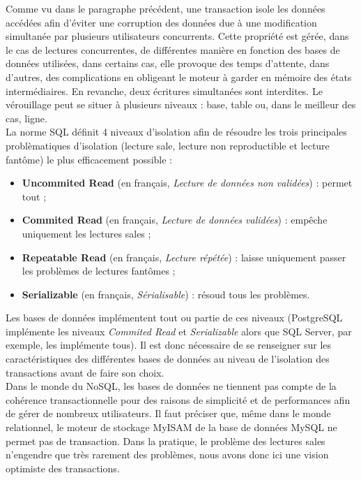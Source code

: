 	Comme vu dans le paragraphe précédent, une transaction isole les données accédées afin d'éviter une corruption des données due à une modification simultanée par plusieurs utilisateurs concurrents. Cette propriété est gérée, dans le cas de lectures concurrentes, de différentes manière en fonction des bases de données utilisées, dans certains cas, elle provoque des temps d'attente, dans d'autres, des complications en obligeant le moteur à garder en mémoire des états intermédiaires. En revanche, deux écritures simultanées sont interdites. Le vérouillage peut se situer à plusieurs niveaux : base, table ou, dans le meilleur des cas, ligne.\\

	La norme SQL définit 4 niveaux d'isolation afin de résoudre les trois principales problèmatiques d'isolation (lecture sale, lecture non reproductible et lecture fantôme) le plus efficacement possible :
	\vspace{10px}
	\begin{itemize}
		\item \textbf{Uncommited Read} (en français, \textit{Lecture de données non validées}) : permet tout ;
		\item \textbf{Commited Read} (en français, \textit{Lecture de données validées}) : empêche uniquement les lectures sales ;
		\item \textbf{Repeatable Read} (en français, \textit{Lecture répétée}) : laisse uniquement passer les problèmes de lectures fantômes ;
		\item \textbf{Serializable} (en français, \textit{Sérialisable}) : résoud tous les problèmes.
	\end{itemize}
	\vspace{20px}
	 Les bases de données implémentent tout ou partie de ces niveaux (PostgreSQL implémente les niveaux \textit{Commited Read} et \textit{Serializable}\cite{isolationTransactionPostgre} alors que SQL Server, par exemple, les implémente tous\cite{isolationTransactionSQLServer}). Il est donc nécessaire de se renseigner sur les caractéristiques des différentes bases de données au niveau de l'isolation des transactions avant de faire son choix.\\

	Dans le monde du NoSQL, les bases de données ne tiennent pas compte de la cohérence transactionnelle pour des raisons de simplicité et de performances afin de gérer de nombreux utilisateurs. Il faut préciser que, même dans le monde relationnel, le moteur de stockage MyISAM de la base de données MySQL ne permet pas de transaction. Dans la pratique, le problème des lectures sales n'engendre que très rarement des problèmes, nous avons donc ici une vision optimiste des transactions.
